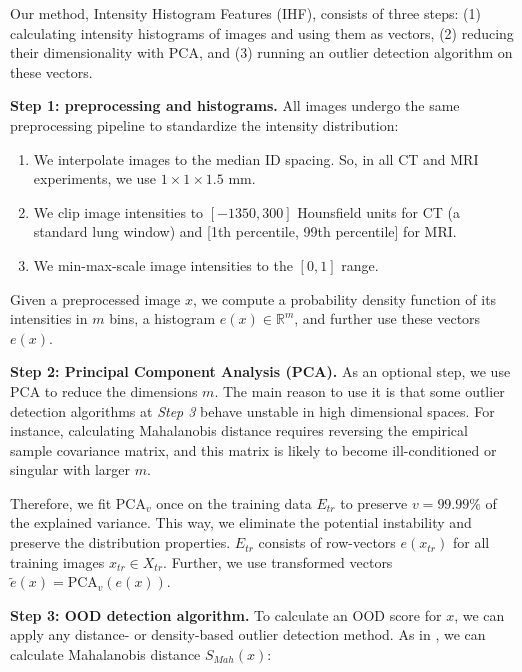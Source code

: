 Our method, Intensity Histogram Features (IHF), consists of three steps: (1) calculating intensity histograms of images and using them as vectors, (2) reducing their dimensionality with PCA, and (3) running an outlier detection algorithm on these vectors.


\textbf{Step 1: preprocessing and histograms.} All images undergo the same preprocessing pipeline to standardize the intensity distribution:

\begin{enumerate}	
	\item We interpolate images to the median ID spacing. So, in all CT and MRI experiments, we use $1 \times 1 \times 1.5$ mm.
	\item We clip image intensities to $[-1350, 300]$ Hounsfield units for CT (a standard lung window) and [1{th} percentile, 99{th} percentile] for MRI.
	\item We min-max-scale image intensities to the $[0, 1]$ range.
\end{enumerate}

Given a preprocessed image $x$, we compute a probability density function of its intensities in $m$ bins, a histogram $e(x) \in \mathbb{R}^m$, and further use these vectors $e(x)$.


\textbf{Step 2: Principal Component Analysis (PCA).} As an optional step, we use PCA to reduce the dimensions $m$. The main reason to use it is that some outlier detection algorithms at \textit{Step 3} behave unstable in high dimensional spaces. For instance, calculating Mahalanobis distance requires reversing the empirical sample covariance matrix, and this matrix is likely to become ill-conditioned or singular with larger $m$.

Therefore, we fit PCA$_v$ once on the training data $E_{tr}$ to preserve $v = 99.99\%$ of the explained variance. This way, we eliminate the potential instability and preserve the distribution properties. $E_{tr}$ consists of row-vectors $e(x_{tr})$ for all training images $x_{tr} \in X_{tr}$. Further, we use transformed vectors $\tilde{e}(x) = \text{PCA}_v (e(x))$. %


\textbf{Step 3: OOD detection algorithm.}
To calculate an OOD score for $x$, we can apply any distance- or density-based outlier detection method. As in \cite{lee2018simple}, we can calculate Mahalanobis distance $S_{Mah}(x)$: 

